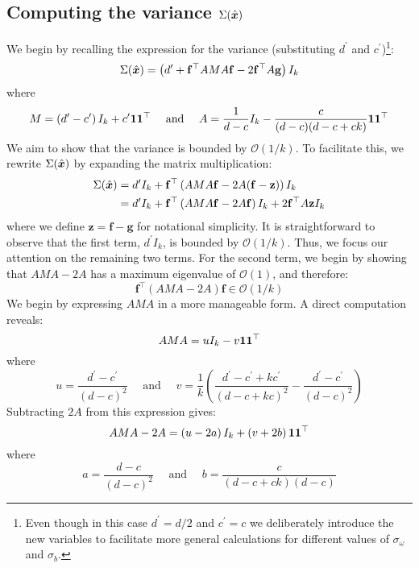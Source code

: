 \subsection{Computing the variance $\Sigma(\hat{\boldsymbol{x}})$}
We begin by recalling the expression for the variance (substituting $d^\prime$ and $c^\prime$)\footnote{Even though in this case $d^\prime = d/2$ and $c^\prime = c$ we deliberately introduce the new variables to facilitate more general calculations for different values of $\sigma_\omega$ and $\sigma_b$.}:
\begin{equation*}
    \Sigma(\hat{\boldsymbol{x}}) = \left(d^\prime+\mathbf{f}^\top AMA \mathbf{f} - 2\mathbf{f}^\top A \mathbf{g}\right)I_k
\end{equation*}
where
\begin{equation*}
    M = \left(d^\prime-c^\prime \right)I_k + c^\prime
    \boldsymbol{1}\boldsymbol{1}^\top \quad \textrm{ and } \quad A = \frac{1}{d-c} I_k - \frac{c}{(d-c)(d-c+ck)}\boldsymbol{1}\boldsymbol{1}^\top
\end{equation*}
We aim to show that the variance is bounded by $\mathcal{O}\left(1/k\right)$. To facilitate this, we rewrite $\Sigma(\hat{\boldsymbol{x}})$ by expanding the matrix multiplication:
\begin{align*}
    \Sigma(\hat{\boldsymbol{x}}) &= d^\prime I_k+\mathbf{f}^\top \left(AMA \mathbf{f} - 2A (\mathbf{f}-\mathbf{z})\right)I_k\\
    &= d^\prime I_k+\mathbf{f}^\top \left(AMA \mathbf{f} - 2A\mathbf{f}\right)I_k + 2\mathbf{f}^\top A\mathbf{z}I_k
\end{align*}
where we define $\mathbf{z} = \mathbf{f} - \mathbf{g}$ for notational simplicity. It is straightforward to observe that the first term, $d^\prime I_k$, is bounded by $\mathcal{O}\left(1/k\right)$. Thus, we focus our attention on the remaining two terms. For the second term, we begin by showing that $AMA-2A$ has a maximum eigenvalue of $\mathcal{O}(1)$, and therefore:
$$\mathbf{f}^\top(AMA-2A)\mathbf{f}\in\mathcal{O}\left(1/k\right)$$
We begin by expressing $AMA$ in a more manageable form. A direct computation reveals:
$$AMA = uI_k - v\boldsymbol{1}\boldsymbol{1}^\top$$
where 
\begin{equation*}
 u = \frac{d^\prime - c^\prime}{\left(d-c\right)^2} \quad\textrm{ and }\quad v = \frac{1}{k}\left(\frac{d^\prime -c^\prime + kc^\prime}{\left(d -c + kc\right)^2}- \frac{d^\prime-c^\prime}{\left(d-c\right)^2}\right)
\end{equation*}
Subtracting $2A$ from this expression gives:
$$AMA-2A = \left(u-2a\right)I_k + \left(v+2b\right)\boldsymbol{1}\boldsymbol{1}^\top$$
where
\begin{equation*}
 a = \frac{d - c}{\left(d-c\right)^2} \quad\textrm{ and }\quad b = \frac{c}{\left(d-c+ck\right)\left(d-c\right)}
\end{equation*}

